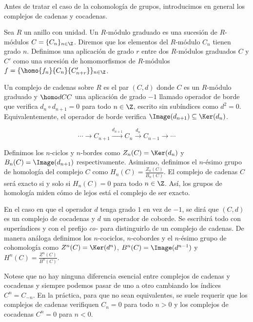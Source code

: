 Antes de tratar el caso de la cohomología de grupos, introducimos en general los complejos de cadenas y cocadenas.
	


Sea $R$ un anillo con unidad. Un $R$-módulo graduado es una sucesión de $R$-módulos $C=\{C_n\}_{n\in\Z}$. Diremos que los elementos del $R$-módulo $C_n$ tienen grado $n$.
Definimos una aplicación de grado $r$ entre dos $R$-módulos graduados $C$ y $C'$ como una sucesión de homomorfismos de $R$-módulos $f=\{\homo {f_n} {C_n} {C_{n+r}'}\}_{n\in\Z}$.

Un complejo de cadenas sobre $R$ es el par $(C,d)$ donde $C$ es un $R$-módulo graduado y $\homo d C C$ una aplicación de grado $-1$ llamado operador de borde que verifica $d_{n}\circ d_{n+1}=0$ para todo $n\in\Z$, escrito sin subíndices como $d^2 = 0$. Equivalentemente, el operador de borde verifica $\Image(d_{n+1})\subseteq \Ker(d_{n})$.

\begin{equation}
	\cdots  \xrightarrow{} C_{n+1} \xrightarrow{d_{n+1}} C_n \xrightarrow{d_n} C_{n-1} \xrightarrow{} \cdots 
\end{equation}

Definimos los $n$-ciclos y $n$-bordes como $Z_n(C)=\Ker(d_{n})$ y $B_n(C)=\Image(d_{n+1})$ respectivamente. Asimismo, definimos el $n$-ésimo grupo de homología del complejo $C$ como $H_n(C) = \frac{Z_n(C)}{B_n(C)}$. El complejo de cadenas $C$ será exacto si y solo si $H_n(C) = 0$ para todo $n\in\Z$. Así, los grupos de homología miden cómo de lejos está el complejo de ser exacto.

En el caso en que el operador $d$ tenga grado $1$ en vez de $-1$, se dirá que $(C,d)$ es un complejo de cocadenas y $d$ un operador de coborde. Se escribirá todo con superíndices y con el prefijo \textit{co-} para distinguirlo de un complejo de cadenas. De manera análoga definimos los $n$-cociclos, $n$-cobordes y el $n$-ésimo grupo de cohomología como $Z^n(C)=\Ker(d^n)$, $B^n(C)=\Image(d^{n-1})$ y $H^n(C)=\frac{Z^n(C)}{B^n(C)}$.

Notese que no hay ninguna diferencia esencial entre complejos de cadenas y cocadenas y siempre podemos pasar de uno a otro cambiando los índices $C^n = C_{-n}$. En la práctica, para que no sean equivalentes, se suele requerir que los complejos de cadenas verifiquen $C_n = 0$ para todo $n>0$ y los complejos de cocadenas $C^n=0$ para $n<0$.

